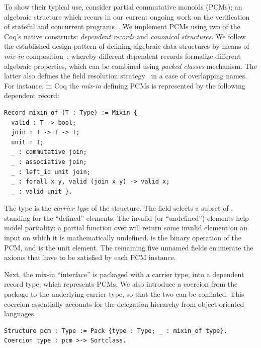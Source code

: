 To show their typical use, consider partial commutative monoids
(PCMs); an algebraic structure which recurs in our current ongoing
work on the verification of stateful and concurrent
programs~\citep{Nanevski-al:ESOP14}. We implement PCMs using two of the
Coq's native constructs: \emph{dependent records} and \emph{canonical
  structures}.  We follow the established \ssreflect design pattern of
defining algebraic data structures by means of \emph{mix-in}
composition~\citep{Garillot:PhD}, whereby different dependent records
formalize different algebraic properties, which can be combined using
\emph{packed classes} mechanism. The latter also defines the field
resolution strategy~\citep{Garillot-al:TPHOL09} in a case of
overlapping names.
%
%
%
For instance, in Coq the \emph{mix-in} defining PCMs is represented by the
following dependent record:
\begin{lstlisting}
Record mixin_of (T : Type) := Mixin {
  valid : T -> bool;
  join : T -> T -> T;
  unit : T;
  _ : commutative join;
  _ : associative join;
  _ : left_id unit join;
  _ : forall x y, valid (join x y) -> valid x;
  _ : valid unit }.
\end{lstlisting}
%
The type  is the \emph{carrier type} of the structure. The
field  selects a subset of , standing for the
``defined'' elements. The invalid (or ``undefined'') elements help
model partiality: a partial function over  will return some
invalid element on an input on which it is mathematically undefined.
 is the binary operation of the PCM, and 
is the unit element. The remaining five unnamed fields enumerate the
axioms that have to be satisfied by each PCM instance.

Next, the mix-in ``interface'' is packaged with a carrier type, into a
dependent record type, which represents PCMs. We also introduce a
coercion from the package to the underlying carrier type, so that the
two can be conflated. This coercion essentially accounts for the
delegation hierarchy from object-oriented languages.
%
\begin{lstlisting}
Structure pcm : Type := Pack {type : Type; _ : mixin_of type}.
Coercion type : pcm >-> Sortclass.
\end{lstlisting}

